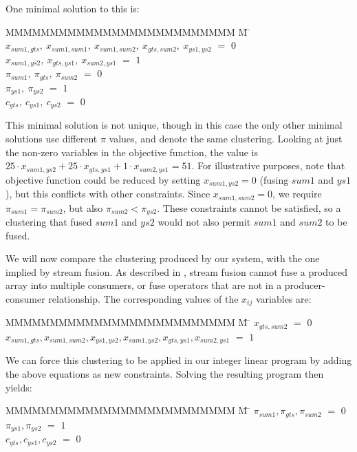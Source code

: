 One minimal solution to this is:
\begin{tabbing}
MMMMMMMMMMMMMMMMMMMMMMMMMM \= M \= \kill
$x_{sum1, gts},~ x_{sum1, sum1},~ x_{sum1, sum2},~ x_{gts, sum2},~ x_{ys1,  ys2}$
    \> $=$ \> $0$ \\
$x_{sum1, ys2},~ x_{gts, ys1},~   x_{sum2, ys1}$
    \> $=$ \> $1$ 
\\[1ex]
$\pi_{sum1},~ \pi_{gts },~ \pi_{sum2}$
    \> $=$ \> $0$ \\
$\pi_{ys1 },~ \pi_{ys2 }$
    \> $=$ \> $1$ 
\\[1ex]
$c_{gts},~ c_{ys1},~ c_{ys2}$           
    \> $=$ \> $0$
\end{tabbing}

This minimal solution is not unique, though in this case the only other minimal solutions use different $\pi$ values, and denote the same clustering. Looking at just the non-zero variables in the objective function, the value is $25 \cdot x_{sum1,ys2} + 25 \cdot x_{gts,ys1} + 1 \cdot x_{sum2, ys1} = 51$. For illustrative purposes, note that objective function could be reduced by setting $x_{sum1,ys2} = 0$ (fusing $sum1$ and $ys1$), but this conflicts with other constraints. Since $x_{sum1, sum2} = 0$, we require $\pi_{sum1} = \pi_{sum2}$, but also \mbox{$\pi_{sum2} < \pi_{ys2}$}. These constraints cannot be satisfied, so a clustering that fused $sum1$ and $ys2$ would not also permit $sum1$ and $sum2$ to be fused.

We will now compare the clustering produced by our system, with the one implied by stream fusion. As described in \cite{lippmeier2013data}, stream fusion cannot fuse a produced array into multiple consumers, or fuse operators that are not in a producer-consumer relationship. The corresponding values of the $x_{ij}$ variables are:
\begin{tabbing}
MMMMMMMMMMMMMMMMMMMMMMMMMM \= M \= \kill
$x_{gts, sum2}$
    \> $=$ \> $0$ \\
$x_{sum1, gts}, x_{sum1, sum2}, x_{ys1,  ys2}, x_{sum1, ys2}, x_{gts, ys1 }, x_{sum2, ys1}$
    \> $=$ \> $1$
\end{tabbing}

We can force this clustering to be applied in our integer linear program by adding the above equations as new constraints. Solving the resulting program then yields:
\begin{tabbing}
MMMMMMMMMMMMMMMMMMMMMMMMMM \= M \= \kill
$\pi_{sum1}, \pi_{gts }, \pi_{sum2}$
    \> $=$ \> $0$ \\
$\pi_{ys1 }, \pi_{ys2 }$
    \> $=$ \> $1$ \\
$c_{gts}, c_{ys1}, c_{ys2}$           
    \> $=$ \> $0$
\end{tabbing}

